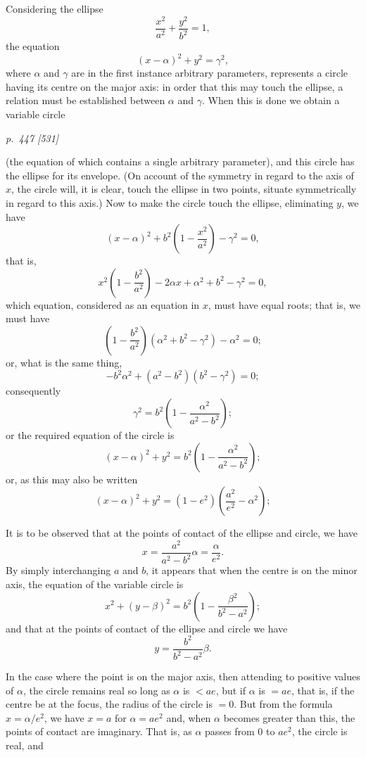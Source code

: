 \documentclass[11pt,a4paper]{article}
\theoremstyle{plain}
\theoremstyle{definition}
\begin{document}
\medskip
Considering the ellipse
\[
\frac{x^2}{a^2} + \frac{y^2}{b^2} = 1,
\]
the equation
\[
(x - \alpha)^2 + y^2 = \gamma^2,
\]
where $\alpha$ and $\gamma$ are in the first instance arbitrary parameters, represents a circle having
its centre on the major axis: in order that this may touch the ellipse, a relation
must be established between $\alpha$ and $\gamma$. When this is done we obtain a variable circle

\clearpage

\bigskip
\textit{p.~447 [531]}
\smallskip

(the equation of which contains a single arbitrary parameter), and this circle has the
ellipse for its envelope. (On account of the symmetry in regard to the axis of $x$, the
circle will, it is clear, touch the ellipse in two points, situate symmetrically in regard
to this axis.) Now to make the circle touch the ellipse, eliminating $y$, we have
\[
(x - \alpha)^2 + b^2\left(1 - \frac{x^2}{a^2}\right) - \gamma^2 = 0,
\]
that is,
\[
x^2\left(1 - \frac{b^2}{a^2}\right) - 2\alpha x + \alpha^2 + b^2 - \gamma^2 = 0,
\]
which equation, considered as an equation in $x$, must have equal roots; that is, we
must have
\[
\left(1 - \frac{b^2}{a^2}\right)(\alpha^2 + b^2 - \gamma^2) - \alpha^2 = 0;
\]
or, what is the same thing,
\[
-b^2\alpha^2 + (a^2-b^2)(b^2-\gamma^2) = 0;
\]
consequently
\[
\gamma^2 = b^2\left(1 - \frac{\alpha^2}{a^2 - b^2}\right);
\]
or the required equation of the circle is
\[
(x - \alpha)^2 + y^2 = b^2\left(1 - \frac{\alpha^2}{a^2 - b^2}\right);
\]
or, as this may also be written
\[
(x - \alpha)^2 + y^2 = (1 - e^2)\left(\frac{a^2}{e^2} - \alpha^2\right);
\]

It is to be observed that at the points of contact of the ellipse and circle, we have
\[
x = \frac{a^2}{a^2 - b^2}\alpha = \frac{\alpha}{e^2}.
\]
By simply interchanging $a$ and $b$, it appears that when the centre is on the minor axis,
the equation of the variable circle is
\[
x^2 + (y - \beta)^2 = b^2\left(1 - \frac{\beta^2}{b^2 - a^2}\right);
\]
and that at the points of contact of the ellipse and circle we have
\[
y = \frac{b^2}{b^2 - a^2}\beta.
\]

In the case where the point is on the major axis, then attending to positive
values of $\alpha$, the circle remains real so long as $\alpha$ is $< ae$, but if $\alpha$ is $=ae$, that is,
if the centre be at the focus, the radius of the circle is $=0$. But from the formula
$x = \alpha/e^2$, we have $x = a$ for $\alpha = ae^2$ and, when $\alpha$ becomes greater than this, the points
of contact are imaginary. That is, as $\alpha$ passes from $0$ to $ae^2$, the circle is real, and
\end{document}
